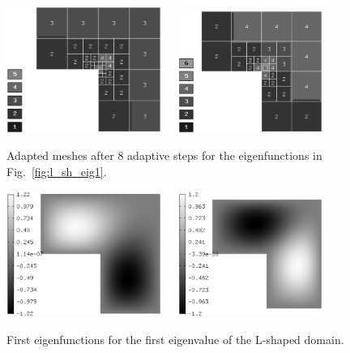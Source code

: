 \documentclass[smallextended]{svjour3}
\begin{document}
\begin{figure}[!ht]
\begin{center}
\includegraphics[width=0.45\textwidth]{lshape3.eps}\ \ \ 
\includegraphics[width=0.42\textwidth]{lshape4.eps}
\end{center}
\caption{Adapted meshes after 8 adaptive steps for the eigenfunctions in Fig.~\ref{fig:l_sh_eig1}.}
\label{fig:l_sh_eig2}
\end{figure}

\begin{figure}[!ht]
\begin{center}
\includegraphics[width=0.45\textwidth]{lshape5.eps}\ \ \ 
\includegraphics[width=0.42\textwidth]{lshape6.eps}
\end{center}
\caption{First eigenfunctions for the first eigenvalue of the L-shaped domain.}
\label{fig:l_sh_eig3}
\end{figure}
\end{document}
